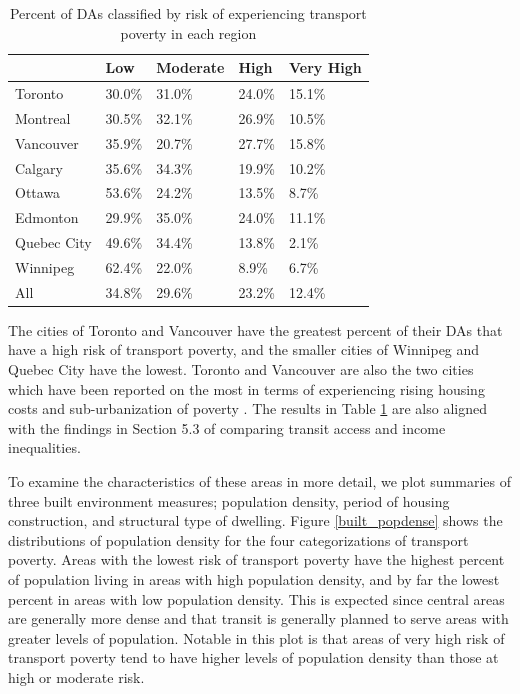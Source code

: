 \documentclass[11 pt, letterpaper]{article}
\begin{document}
{\begin{table}[H]
	\vspace{2mm}
	\centering
	\renewcommand{\arraystretch}{0.75} %
	\caption{Percent of DAs classified by risk of experiencing transport poverty in each region}
	\label{pov_by_city}
	\begin{tabular}{l|llll}

		& Low      & Moderate   & High     & Very High  \\
		\hline
		Toronto     & 30.0\%   & 31.0\%     & 24.0\%   & 15.1\%     \\
		Montreal    & 30.5\%   & 32.1\%     & 26.9\%   & 10.5\%     \\
		Vancouver   & 35.9\%   & 20.7\%     & 27.7\%   & 15.8\%     \\
		Calgary     & 35.6\%   & 34.3\%     & 19.9\%   & 10.2\%     \\
		Ottawa      & 53.6\%   & 24.2\%     & 13.5\%   & 8.7\%      \\
		Edmonton    & 29.9\%   & 35.0\%     & 24.0\%   & 11.1\%     \\
		Quebec City & 49.6\%   & 34.4\%     & 13.8\%   & 2.1\%      \\
		Winnipeg    & 62.4\%   & 22.0\%     & 8.9\%    & 6.7\%      \\
		\hline
		All         & 34.8\%   & 29.6\%     & 23.2\%   & 12.4\%    
	\end{tabular}
\end{table}

The cities of Toronto and Vancouver have the greatest percent of their DAs that have a high risk of transport poverty, and the smaller cities of Winnipeg and Quebec City have the lowest. Toronto and Vancouver are also the two cities which have been reported on the most in terms of experiencing rising housing costs and sub-urbanization of poverty \cite{ades2012,ades2016poverty}. The results in Table \ref{pov_by_city} are also aligned with the findings in Section 5.3 of comparing transit access and income inequalities.

To examine the characteristics of these areas in more detail, we plot summaries of three built environment measures; population density, period of housing construction, and structural type of dwelling. Figure \ref{built_popdense} shows the distributions of population density for the four categorizations of transport poverty. Areas with the lowest risk of transport poverty have the highest percent of population living in areas with high population density, and by far the lowest percent in areas with low population density. This is expected since central areas are generally more dense and that transit is generally planned to serve areas with greater levels of population. Notable in this plot is that areas of very high risk of transport poverty tend to have higher levels of population density than those at high or moderate risk. 

}
\end{document}
